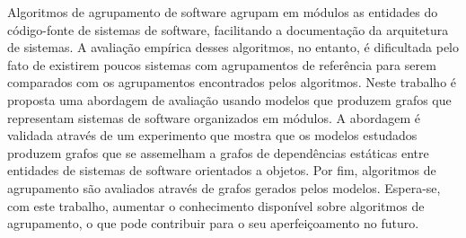 Algoritmos de agrupamento de software agrupam em módulos as entidades do código-fonte de sistemas de software, facilitando a documentação da arquitetura de sistemas. A avaliação empírica desses algoritmos, no entanto, é dificultada pelo fato de existirem poucos sistemas com agrupamentos de referência para serem comparados com os agrupamentos encontrados pelos algoritmos. Neste trabalho é proposta uma abordagem de avaliação usando modelos que produzem grafos que representam sistemas de software organizados em módulos. A abordagem é validada através de um experimento que mostra que os modelos estudados produzem grafos que se assemelham a grafos de dependências estáticas entre entidades de sistemas de software orientados a objetos. Por fim, algoritmos de agrupamento são avaliados através de grafos gerados pelos modelos. Espera-se, com este trabalho, aumentar o conhecimento disponível sobre algoritmos de agrupamento, o que pode contribuir para o seu aperfeiçoamento no futuro.
